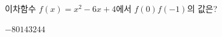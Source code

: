 이차함수 $f(x)=x^2-6x+4$에서 $f(0)f(-1)$의 값은?
\begin{choices32}{$-8$}{$0$}{$14$}{$32$}{$44$}\end{choices32}
